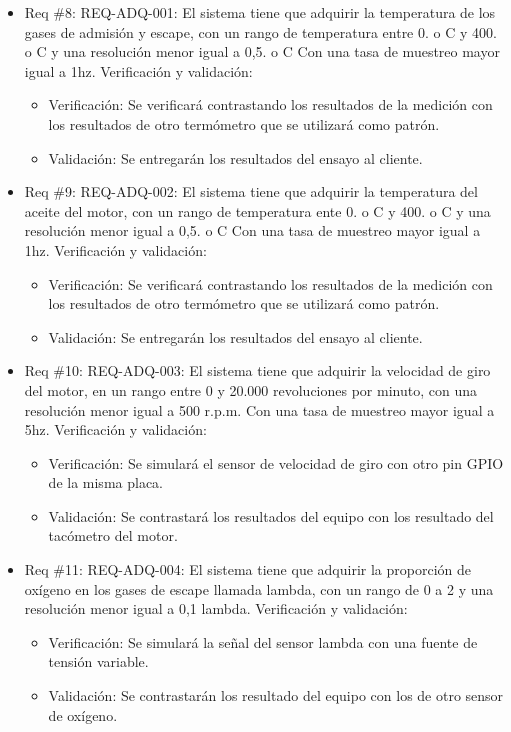 \documentclass[11pt]{charter}
\begin{document}
\begin{itemize} 
\item Req \#8: REQ-ADQ-001: El sistema tiene que adquirir la temperatura de los gases de
admisión y escape, con un rango de temperatura entre 0. o C y 400. o C y una resolución
menor igual a 0,5. o C Con una tasa de muestreo mayor igual a 1hz.
Verificación y validación:
\begin{itemize}
\item Verificación: Se verificará contrastando los resultados de la medición con los resultados de otro termómetro que se utilizará como patrón.
\item Validación: Se entregarán los resultados del ensayo al cliente.
\end{itemize}
\end{itemize}

\begin{itemize} 
\item Req \#9: REQ-ADQ-002: El sistema tiene que adquirir la temperatura del aceite del motor,
con un rango de temperatura ente 0. o C y 400. o C y una resolución menor igual a
0,5. o C Con una tasa de muestreo mayor igual a 1hz.
Verificación y validación:
\begin{itemize}
\item Verificación: Se verificará contrastando los resultados de la medición con los resultados de otro termómetro que se utilizará como patrón.
\item Validación: Se entregarán los resultados del ensayo al cliente.
\end{itemize}
\end{itemize}

\begin{itemize} 
\item Req \#10: REQ-ADQ-003: El sistema tiene que adquirir la velocidad de giro del motor, en
un rango entre 0 y 20.000 revoluciones por minuto, con una resolución menor igual
a 500 r.p.m. Con una tasa de muestreo mayor igual a 5hz.
Verificación y validación:
\begin{itemize}
\item Verificación: Se simulará el sensor de velocidad de giro con otro pin GPIO de la misma placa.
\item Validación: Se contrastará los resultados del equipo con los resultado del tacómetro del motor.
\end{itemize}
\end{itemize}

\begin{itemize} 
\item Req \#11: REQ-ADQ-004: El sistema tiene que adquirir la proporción de oxígeno en los gases
de escape llamada lambda, con un rango de 0 a 2 y una resolución menor igual a 0,1
lambda.
Verificación y validación:
\begin{itemize}
\item Verificación: Se simulará la señal del sensor lambda con una fuente de tensión variable.
\item Validación: Se contrastarán los resultado del equipo con los de otro sensor de oxígeno.
\end{itemize}
\end{itemize}
\end{document}
